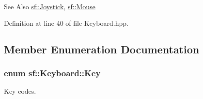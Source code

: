 \begin{DoxySeeAlso}{See Also}
\hyperlink{classsf_1_1Joystick}{sf\-::\-Joystick}, \hyperlink{classsf_1_1Mouse}{sf\-::\-Mouse} 
\end{DoxySeeAlso}


Definition at line 40 of file Keyboard.\-hpp.



\subsection{Member Enumeration Documentation}
\hypertarget{classsf_1_1Keyboard_acb4cacd7cc5802dec45724cf3314a142}{
\subsubsection[{Key}]{\setlength{\rightskip}{0pt plus 5cm}enum {\bf sf\-::\-Keyboard\-::\-Key}}}\label{classsf_1_1Keyboard_acb4cacd7cc5802dec45724cf3314a142}


Key codes. 

